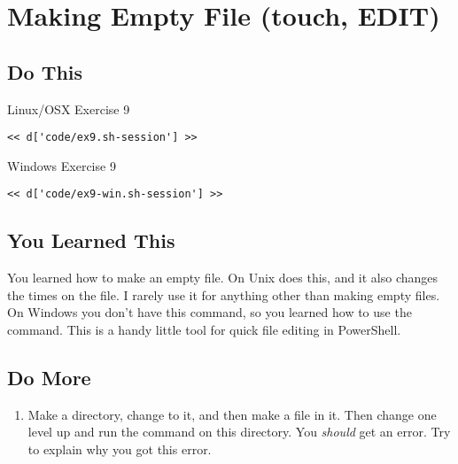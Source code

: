 \chapter{Making Empty File (touch, EDIT)}

\section{Do This}

\begin{code}{Linux/OSX Exercise 9}
\begin{Verbatim}
<< d['code/ex9.sh-session'] >>
\end{Verbatim}
\end{code}

\begin{code}{Windows Exercise 9}
\begin{Verbatim}
<< d['code/ex9-win.sh-session'] >>
\end{Verbatim}
\end{code}

\section{You Learned This}

You learned how to make an empty file.  On Unix  does this, and
it also changes the times on the file.  I rarely use it for anything other than
making empty files.  On Windows you don't have this command, so you learned
how to use the  command.  This is a handy little tool for 
quick file editing in PowerShell.

\section{Do More}

\begin{enumerate}
\item Make a directory, change to it, and then make a file in it.  Then change
    one level up and run the  command on this directory.  You
    \emph{should} get an error.  Try to explain why you got this error.
\end{enumerate}

